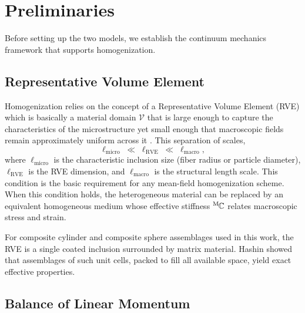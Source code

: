 \documentclass[oneside, 12pt, a4paper, bibliography=totoc]{book}
\begin{document}
\section{Preliminaries}
\label{sec:preliminaries}

Before setting up the two models, we establish the continuum mechanics framework that supports homogenization.

\subsection{Representative Volume Element}
\label{subsec:rve}

Homogenization relies on the concept of a Representative Volume Element (RVE) which is basically a material domain $\mathcal{V}$ that is large enough to capture the characteristics of the microstructure yet small enough that macroscopic fields remain approximately uniform across it \cite{Hill1963}. This separation of scales,
%
\begin{equation}
    \ell_{\text{micro}} \;\ll\; \ell_{\text{RVE}} \;\ll\; \ell_{\text{macro}},
    \label{eq:scale_separation}
\end{equation}
%
where $\ell_{\text{micro}}$ is the characteristic inclusion size (fiber radius or particle diameter), $\ell_{\text{RVE}}$ is the RVE dimension, and $\ell_{\text{macro}}$ is the structural length scale. This condition is the basic requirement for any mean-field homogenization scheme. When this condition holds, the heterogeneous material can be replaced by an equivalent homogeneous medium whose effective stiffness ${}^{\mathrm{M}}\hspace{-1pt}\mathbb{C}$ relates macroscopic stress and strain.

For composite cylinder and composite sphere assemblages used in this work, the RVE is a single coated inclusion surrounded by matrix material. Hashin \cite{Hashin1964} showed that assemblages of such unit cells, packed to fill all available space, yield exact effective properties.

\subsection{Balance of Linear Momentum}
\label{subsec:balance_equations}
\end{document}
